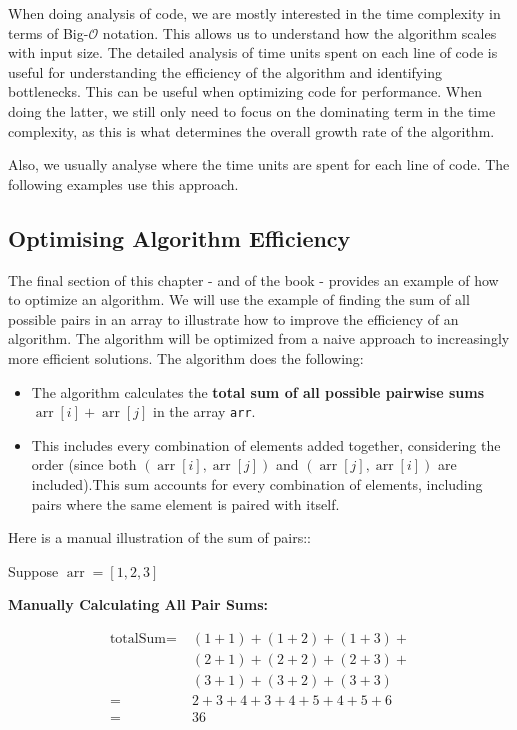 When doing analysis of code, we are mostly interested in the time complexity in terms of Big-$\mathcal{O}$ notation. This allows us to understand how the algorithm scales with input size. The detailed analysis of time units spent on each line of code is useful for understanding the efficiency of the algorithm and identifying bottlenecks. This can be useful when optimizing code for performance. When doing the latter, we still only need to focus on the dominating term in the time complexity, as this is what determines the overall growth rate of the algorithm.

Also, we usually analyse where the time units are spent for each line of code. The following examples use this approach.

\subsection*{Optimising Algorithm Efficiency}
The final section of this chapter - and of the book - provides an example of how to optimize an algorithm. We will use the example of finding the sum of all possible pairs in an array to illustrate how to improve the efficiency of an algorithm. The algorithm will be optimized from a naive approach to increasingly more efficient solutions. The algorithm does the following:

\begin{itemize}
    \item The algorithm calculates the \textbf{total sum of all possible pairwise sums} $\operatorname{arr}[i]+\operatorname{arr}[j]$ in the array \texttt{arr}.
    \item This includes every combination of elements added together, considering the order (since both $(\operatorname{arr}[i], \operatorname{arr}[j])$ and $(\operatorname{arr}[j], \operatorname{arr}[i])$ are included).This sum accounts for every combination of elements, including pairs where the same element is paired with itself.
\end{itemize}

\begin{example} Here is a manual illustration of the sum of pairs::

    Suppose $\operatorname{arr}=[1,2,3]$

   \textbf{ Manually Calculating All Pair Sums:}
    
   \begin{align*}
    \text{totalSum} = & \; (1+1)+(1+2)+(1+3)+ \\
                    & \; (2+1)+(2+2)+(2+3)+ \\
                    & \; (3+1)+(3+2)+(3+3) \\
                    = & \; 2+3+4+3+4+5+4+5+6 \\
                    = & \; 36
    \end{align*}
    
\end{example}

